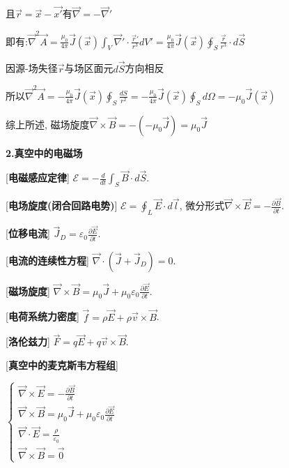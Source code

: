 \qquad \qquad 且$\vec r=\vec x-\vec {x'}$有$\vec\nabla=-\vec\nabla'$\par
\qquad \qquad \quad 即有:$\vec\nabla^2\vec A=\frac{\mu_0}{4\pi}\vec J(\vec{x})\int_V\vec\nabla' \cdot\frac{\vec r'}{r^3}dV'=\frac{\mu_0}{4\pi}\vec J(\vec x)\oint_S\frac{\vec r}{r^3}\cdot d\vec S$\par
\qquad \qquad 因源-场失径$\vec r$与场区面元$d\vec S$方向相反\par
\qquad \qquad \quad 所以$\vec\nabla^2\vec A=-\frac{\mu_0}{4\pi}\vec J(\vec x)\oint_S\frac{dS}{r^2}=-\frac{\mu_0}{4\pi}\vec J(\vec x)\oint_S d\Omega=-\mu_0\vec J(\vec x)$\par
\qquad 综上所述, 磁场旋度$\vec\nabla\times\vec B=-(-\mu_0\vec J)=\mu_0\vec J$\par

\clearpage

\begin{center}
 \textbf{2.真空中的电磁场}
\end{center}

[\textbf{电磁感应定律}] $\mathscr E=-\frac{d}{dt}\int_S\vec B\cdot d\vec S$.\par

[\textbf{电场旋度(闭合回路电势)}] $\mathscr E=\oint_L\vec E\cdot d\vec l$, 微分形式$\vec\nabla\times \vec E=-\frac{\partial \vec B}{\partial t}$.\par

[\textbf{位移电流}] $\vec J_D=\varepsilon_0\frac{\partial\vec E}{\partial t}$.\par

[\textbf{电流的连续性方程}] $\vec\nabla\cdot(\vec J+\vec J_D)=0$.\par

[\textbf{磁场旋度}] $\vec\nabla\times\vec B=\mu_0\vec J+\mu_0\varepsilon_0\frac{\partial \vec E}{\partial t}$.\par

[\textbf{电荷系统力密度}] $\vec f=\rho\vec E+\rho\vec v\times\vec B$.\par

[\textbf{洛伦兹力}] $\vec F=q\vec E+q\vec v\times\vec B$.\par

[\textbf{真空中的麦克斯韦方程组}]\par
\qquad $\begin{cases}\vec\nabla\times\vec E=-\frac{\partial\vec B}{\partial t}\quad \\ \vec\nabla\times\vec B=\mu_0\vec J+\mu_0\varepsilon_0\frac{\partial \vec E}{\partial t}\quad \\ \vec\nabla\cdot\vec E=\frac{\rho}{\varepsilon_0}\quad \\ \vec\nabla\times\vec B=\vec 0\quad  \end{cases}$\par

